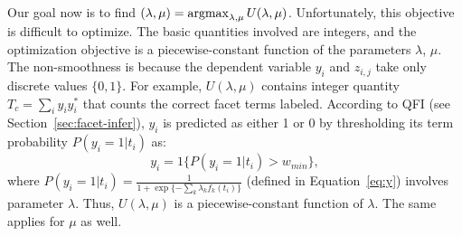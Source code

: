 Our goal now is to find $(\lambda,\mu)=\operatorname*{argmax}_{\lambda,\mu}{U(\lambda,\mu)}$. Unfortunately, this objective is difficult to optimize. The basic quantities involved are integers, and the optimization objective is a piecewise-constant function of the parameters $\lambda$, $\mu$. The non-smoothness is because the dependent variable $y_i$ and $z_{i,j}$ take only discrete values $\{0,1\}$. For example, $U(\lambda,\mu)$ contains integer quantity $T_c=\sum_i{y_iy_i^{*}}$ that counts the correct facet terms labeled. According to QFI (see Section~\ref{sec:facet-infer}), $y_i$ is predicted as either 1 or 0 by thresholding its term probability $P(y_i=1|t_i)$ as:
\begin{equation}
 y_i = 1\{P(y_i=1|t_i)>w_{min}\},
\end{equation}
where $P(y_i=1|t_i)=\frac{1}{1+\exp\{-\sum_k{\lambda_k f_k(t_i)}\}}$ (defined in Equation~\ref{eq:y}) involves parameter $\lambda$. Thus, $U(\lambda,\mu)$ is a piecewise-constant function of $\lambda$. The same applies for $\mu$ as well.

